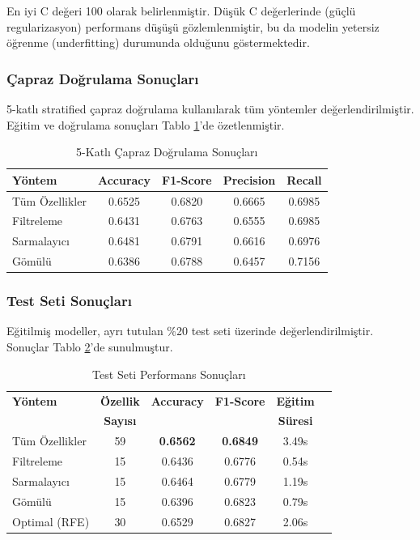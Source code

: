 \documentclass[conference]{IEEEtran}
\begin{document}
En iyi C değeri 100 olarak belirlenmiştir. Düşük C değerlerinde (güçlü regularizasyon) performans düşüşü gözlemlenmiştir, bu da modelin yetersiz öğrenme (underfitting) durumunda olduğunu göstermektedir.

\subsubsection{Çapraz Doğrulama Sonuçları}

5-katlı stratified çapraz doğrulama kullanılarak tüm yöntemler değerlendirilmiştir. Eğitim ve doğrulama sonuçları Tablo \ref{tab:cv_results}'de özetlenmiştir.

\begin{table}[H]
\centering
\caption{5-Katlı Çapraz Doğrulama Sonuçları}
\label{tab:cv_results}
\begin{tabular}{lcccc}
\toprule
\textbf{Yöntem} & \textbf{Accuracy} & \textbf{F1-Score} & \textbf{Precision} & \textbf{Recall} \\
\midrule
Tüm Özellikler & 0.6525 & 0.6820 & 0.6665 & 0.6985 \\
Filtreleme & 0.6431 & 0.6763 & 0.6555 & 0.6985 \\
Sarmalayıcı & 0.6481 & 0.6791 & 0.6616 & 0.6976 \\
Gömülü & 0.6386 & 0.6788 & 0.6457 & 0.7156 \\
\bottomrule
\end{tabular}
\end{table}

\subsubsection{Test Seti Sonuçları}

Eğitilmiş modeller, ayrı tutulan \%20 test seti üzerinde değerlendirilmiştir. Sonuçlar Tablo \ref{tab:test_results}'de sunulmuştur.

\begin{table}[H]
\centering
\caption{Test Seti Performans Sonuçları}
\label{tab:test_results}
\begin{tabular}{lccccc}
\toprule
\textbf{Yöntem} & \textbf{Özellik} & \textbf{Accuracy} & \textbf{F1-Score} & \textbf{Eğitim} \\
 & \textbf{Sayısı} & & & \textbf{Süresi} \\
\midrule
Tüm Özellikler & 59 & \textbf{0.6562} & \textbf{0.6849} & 3.49s \\
Filtreleme & 15 & 0.6436 & 0.6776 & 0.54s \\
Sarmalayıcı & 15 & 0.6464 & 0.6779 & 1.19s \\
Gömülü & 15 & 0.6396 & 0.6823 & 0.79s \\
Optimal (RFE) & 30 & 0.6529 & 0.6827 & 2.06s \\
\bottomrule
\end{tabular}
\end{table}
\end{document}
